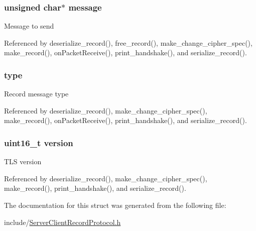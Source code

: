 \subsubsection[{\texorpdfstring{message}{message}}]{\setlength{\rightskip}{0pt plus 5cm}unsigned char$\ast$ message}\hypertarget{structrecord__t_abb13456032cf48eaa794391b6ed937c7}{}\label{structrecord__t_abb13456032cf48eaa794391b6ed937c7}
Message to send 

Referenced by deserialize\+\_\+record(), free\+\_\+record(), make\+\_\+change\+\_\+cipher\+\_\+spec(), make\+\_\+record(), on\+Packet\+Receive(), print\+\_\+handshake(), and serialize\+\_\+record().

\subsubsection[{\texorpdfstring{type}{type}}]{ type}\hypertarget{structrecord__t_ad19c98be8b3445585bee3545c78f6d9c}{}\label{structrecord__t_ad19c98be8b3445585bee3545c78f6d9c}
Record message type 

Referenced by deserialize\+\_\+record(), make\+\_\+change\+\_\+cipher\+\_\+spec(), make\+\_\+record(), on\+Packet\+Receive(), print\+\_\+handshake(), and serialize\+\_\+record().

\subsubsection[{\texorpdfstring{version}{version}}]{\setlength{\rightskip}{0pt plus 5cm}uint16\+\_\+t version}\hypertarget{structrecord__t_ab6d7b6f8c2ceaba7acda80aaf05f4899}{}\label{structrecord__t_ab6d7b6f8c2ceaba7acda80aaf05f4899}
T\+LS version 

Referenced by deserialize\+\_\+record(), make\+\_\+change\+\_\+cipher\+\_\+spec(), make\+\_\+record(), print\+\_\+handshake(), and serialize\+\_\+record().



The documentation for this struct was generated from the following file\+:\begin{DoxyCompactItemize}
\item 
include/\hyperlink{_server_client_record_protocol_8h}{Server\+Client\+Record\+Protocol.\+h}\end{DoxyCompactItemize}

